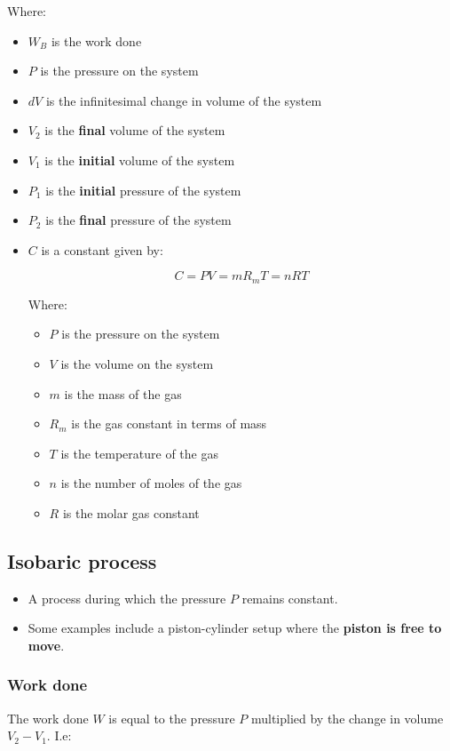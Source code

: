 \documentclass[11pt]{article}
\begin{document}
Where:
\begin{itemize}
\item \(W_B\) is the work done
\item \(P\) is the pressure on the system
\item \(dV\) is the infinitesimal change in volume of the system
\item \(V_2\) is the \textbf{final} volume of the system
\item \(V_1\) is the \textbf{initial} volume of the system
\item \(P_1\) is the \textbf{initial} pressure of the system
\item \(P_2\) is the \textbf{final} pressure of the system
\item \(C\) is a constant given by:

\[C = PV = m R_m T = nRT\]

Where:
\begin{itemize}
\item \(P\) is the pressure on the system
\item \(V\) is the volume on the system
\item \(m\) is the mass of the gas
\item \(R_m\) is the gas constant in terms of mass
\item \(T\) is the temperature of the gas
\item \(n\) is the number of moles of the gas
\item \(R\) is the molar gas constant
\end{itemize}
\end{itemize}

\subsection{Isobaric process}
\label{sec:orgc1bbf07}
\begin{itemize}
\item A process during which the pressure \(P\) remains constant.
\item Some examples include a piston-cylinder setup where the \textbf{piston is free to move}.
\end{itemize}

\subsubsection{Work done}
\label{sec:org981624c}
The work done \(W\) is equal to the pressure \(P\) multiplied by the change in volume \(V_2 - V_1\). I.e:
\end{document}
